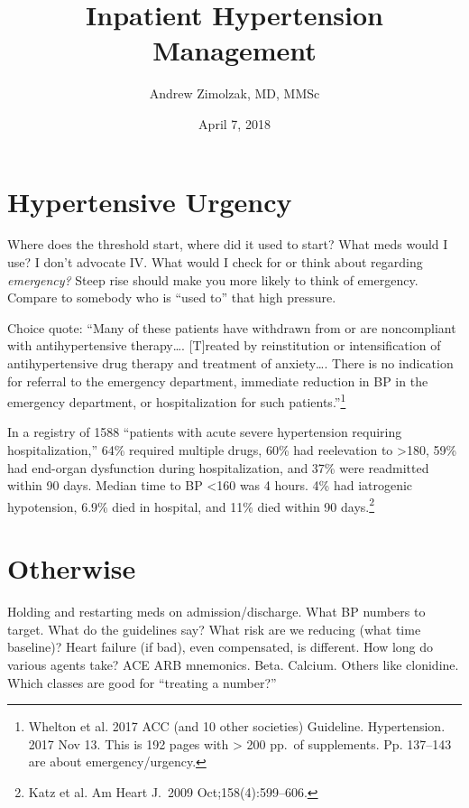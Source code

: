 \documentclass{tufte-handout}
\title{Inpatient Hypertension Management}
\author{Andrew Zimolzak, MD, MMSc}
\date{April 7, 2018}
\begin{document}
\maketitle



\section{Hypertensive Urgency}

Where does the threshold start, where did it used to start?
What meds would I use? I
don't advocate IV. What would I check for or think about regarding
\emph{emergency?} Steep rise should make you more likely to think of
emergency. Compare to somebody who is ``used to'' that high pressure.

Choice quote: ``Many of these
patients have withdrawn from or are noncompliant with antihypertensive therapy\ldots{}.
[T]reated by reinstitution or intensification of antihypertensive drug
therapy and treatment of anxiety\ldots{}. There is no indication for referral to the emergency
department, immediate reduction in BP in the emergency department, or hospitalization for such
patients.''\footnote{Whelton et al. 2017 ACC (and 10 other societies) Guideline. Hypertension. 2017 Nov 13. This is 192 pages with > 200 pp.\ of supplements. Pp. 137--143 are about emergency/urgency.}

In a registry of 1588 ``patients with acute severe hypertension requiring hospitalization,'' 64\% required multiple drugs, 60\% had reelevation to >180, 59\% had end-organ dysfunction during hospitalization, and 37\% were readmitted within 90 days. Median time to BP <160 was 4 hours. 4\% had iatrogenic hypotension, 6.9\% died in hospital, and 11\% died within 90 days.\footnote{Katz et al. Am Heart J.\ 2009 Oct;158(4):599--606.}







\section{Otherwise}

Holding and restarting meds on admission/discharge.
What BP numbers to target. What do the guidelines
say? What risk are we reducing (what time baseline)?
Heart failure (if bad), even compensated, is different.
How long do various agents take? ACE ARB mnemonics. Beta. Calcium.
Others like clonidine. Which classes are good for ``treating a number?''
\end{document}
